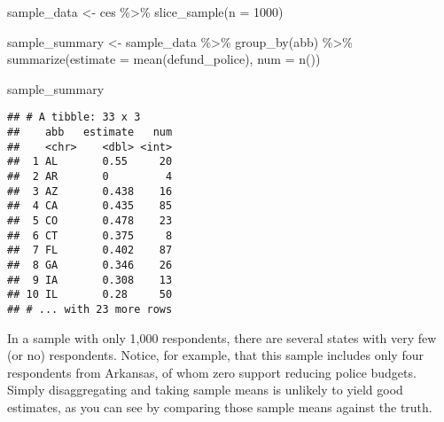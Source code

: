 \documentclass[
]{article}
\newenvironment{Shaded}{\begin{snugshade}}{\end{snugshade}}
\newcommand{\AttributeTok}[1]{\textcolor[rgb]{0.77,0.63,0.00}{#1}}
\newcommand{\DecValTok}[1]{\textcolor[rgb]{0.00,0.00,0.81}{#1}}
\newcommand{\FunctionTok}[1]{\textcolor[rgb]{0.00,0.00,0.00}{#1}}
\newcommand{\NormalTok}[1]{#1}
\newcommand{\OtherTok}[1]{\textcolor[rgb]{0.56,0.35,0.01}{#1}}
\newcommand{\SpecialCharTok}[1]{\textcolor[rgb]{0.00,0.00,0.00}{#1}}
\begin{document}
\begin{Shaded}
\begin{Highlighting}[]
\NormalTok{sample\_data }\OtherTok{\textless{}{-}}\NormalTok{ ces }\SpecialCharTok{\%\textgreater{}\%} 
  \FunctionTok{slice\_sample}\NormalTok{(}\AttributeTok{n =} \DecValTok{1000}\NormalTok{)}
\end{Highlighting}
\end{Shaded}

\begin{Shaded}
\begin{Highlighting}[]
\NormalTok{sample\_summary }\OtherTok{\textless{}{-}}\NormalTok{ sample\_data }\SpecialCharTok{\%\textgreater{}\%} 
  \FunctionTok{group\_by}\NormalTok{(abb) }\SpecialCharTok{\%\textgreater{}\%} 
  \FunctionTok{summarize}\NormalTok{(}\AttributeTok{estimate =} \FunctionTok{mean}\NormalTok{(defund\_police),}
            \AttributeTok{num =} \FunctionTok{n}\NormalTok{())}

\NormalTok{sample\_summary}
\end{Highlighting}
\end{Shaded}

\begin{verbatim}
## # A tibble: 33 x 3
##    abb   estimate   num
##    <chr>    <dbl> <int>
##  1 AL       0.55     20
##  2 AR       0         4
##  3 AZ       0.438    16
##  4 CA       0.435    85
##  5 CO       0.478    23
##  6 CT       0.375     8
##  7 FL       0.402    87
##  8 GA       0.346    26
##  9 IA       0.308    13
## 10 IL       0.28     50
## # ... with 23 more rows
\end{verbatim}

In a sample with only 1,000 respondents, there are several states with
very few (or no) respondents. Notice, for example, that this sample
includes only four respondents from Arkansas, of whom zero support
reducing police budgets. Simply disaggregating and taking sample means
is unlikely to yield good estimates, as you can see by comparing those
sample means against the truth.
\end{document}
